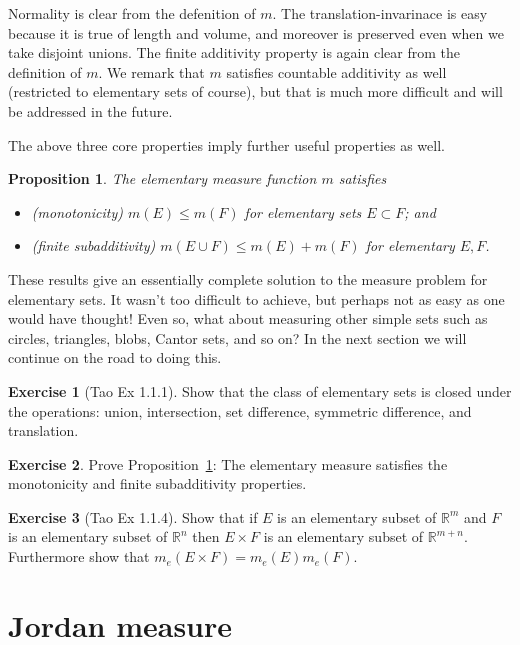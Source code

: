 \documentclass[11pt,oneside]{amsbook}
\newcommand{\RR}{{\mathbb R}}
\theoremstyle{definition}
\newtheorem{exerc}{Exercise}[section]
\theoremstyle{plain}
\newtheorem{prop}[thm]{Proposition}
\theoremstyle{definition}
\theoremstyle{remark}
\numberwithin{equation}{section}
\numberwithin{figure}{section}
\begin{document}
Normality is clear from the defenition of $m$. The translation-invarinace is easy because it is true of length and volume, and moreover is preserved even when we take disjoint unions. The finite additivity property is again clear from the definition of $m$. We remark that $m$ satisfies countable additivity as well (restricted to elementary sets of course), but that is much more difficult and will be addressed in the future.

The above three core properties imply further useful properties as well.

\begin{prop}
  \label{prop:elementary-further}
  The elementary measure function $m$ satisfies
  \begin{itemize}
  \item (monotonicity) $m(E)\leq m(F)$ for elementary sets $E\subset F$; and
  \item (finite subadditivity) $m(E\cup F)\leq m(E)+m(F)$ for elementary $E,F$.
  \end{itemize}
\end{prop}

These results give an essentially complete solution to the measure problem for elementary sets. It wasn't too difficult to achieve, but perhaps not as easy as one would have thought! Even so, what about measuring other simple sets such as circles, triangles, blobs, Cantor sets, and so on? In the next section we will continue on the road to doing this.

\begin{exerc}[Tao Ex 1.1.1]
  Show that the class of elementary sets is closed under the operations: union, intersection, set difference, symmetric difference, and translation.
\end{exerc}

\begin{exerc}
  Prove Proposition~\ref{prop:elementary-further}: The elementary measure satisfies the monotonicity and finite subadditivity properties.
\end{exerc}

\begin{exerc}[Tao Ex 1.1.4]
  Show that if $E$ is an elementary subset of $\RR^m$ and $F$ is an elementary subset of $\RR^n$ then $E\times F$ is an elementary subset of $\RR^{m+n}$. Furthermore show that $m_e(E\times F)=m_e(E)m_e(F)$.
\end{exerc}

\newpage
\section{Jordan measure}
\end{document}
